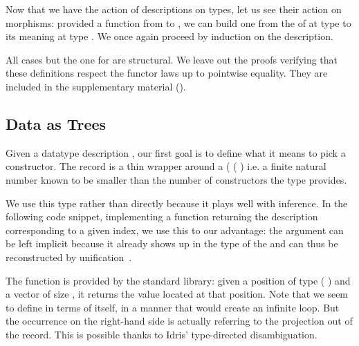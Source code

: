 Now that we have the action of descriptions on types,
let us see their action on morphisms: provided a
function from  to , we can
build one from the  of 
at type  to its meaning at type .
%
We once again proceed by induction on the description.

\label{def:fmap}

All cases but the one for  are structural.
%
We leave out the proofs verifying that these definitions
respect the functor laws up to pointwise equality.
They are included in the supplementary material
().

\subsection{Data as Trees}

Given a datatype description , our first goal is
to define what it means to pick a constructor.
%
The  record is a thin wrapper around a
( ( ) i.e.
a finite natural number known to be smaller than the number of
constructors the  type provides.


We use this type rather than  directly because it
plays well with inference.
%
In the following code snippet, implementing a function returning
the description corresponding to a given index,
we use this to our advantage:
the  argument can be left implicit because it already
shows up in the type of the  and can thus be
reconstructed by unification~\citep{DBLP:conf/tlca/AbelP11}.


The  function is provided by the standard
library: given a position of type ( )
and a vector of size , it returns the value located
at that position.
%
Note that we seem to define 
in terms of itself, in a manner that would create an
infinite loop.
%
But the occurrence on the right-hand side is actually
referring to the projection out of the
 record.
%
This is possible thanks to Idris' type-directed disambiguation.

